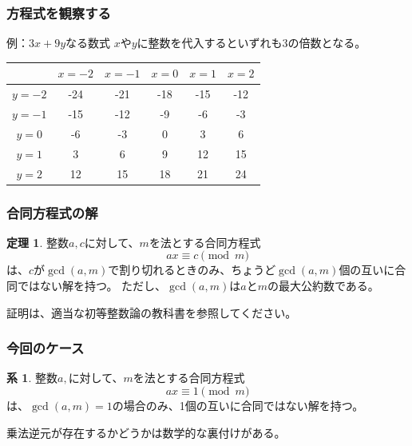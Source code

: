 \documentclass[aspectratio=169,dvipdfmx,14pt,notheorems]{beamer}
\theoremstyle{definition}
\newtheorem{theorem}{定理}
\newtheorem{corollary}{系}
\begin{document}
\begin{frame}[fragile]\frametitle{方程式を観察する}

\begin{exampleblock}{例：$3x + 9y$なる数式}
$x$や$y$に整数を代入するといずれも3の倍数となる。
\begin{table}[]
\begin{tabular}{|c|c|c|c|c|c|}
\hline
       & $x=-2$ & $x=-1$ & $x=0$ & $x=1$ & $x=2$ \\ \hline
$y=-2$ & -24    & -21    & -18   & -15   & -12   \\ \hline
$y=-1$ & -15    & -12    & -9    & -6    & -3    \\ \hline
$y=0$  & -6     & -3     & 0     & 3     & 6     \\ \hline
$y=1$  & 3      & 6      & 9     & 12    & 15    \\ \hline
$y=2$  & 12     & 15     & 18    & 21    & 24    \\ \hline
\end{tabular}
\end{table}

\end{exampleblock}

\end{frame}

\begin{frame}[fragile]\frametitle{合同方程式の解}

\begin{theorem}
整数$a, c$に対して、$m$を法とする合同方程式
\begin{equation*}
ax \equiv c \pmod{m}
\end{equation*}
は、$c$が$\gcd(a, m)$で割り切れるときのみ、ちょうど$\gcd(a, m)$個の互いに合同ではない解を持つ。
ただし、$\gcd(a, m)$は$a$と$m$の最大公約数である。
\end{theorem}
証明は、適当な初等整数論の教科書を参照してください。
\end{frame}

\begin{frame}[fragile]\frametitle{今回のケース}

\begin{corollary}
整数$a,$に対して、$m$を法とする合同方程式
\begin{equation*}
ax \equiv 1 \pmod{m}
\end{equation*}
は、$\gcd(a, m) = 1$の場合のみ、1個の互いに合同ではない解を持つ。
\end{corollary}
乗法逆元が存在するかどうかは数学的な裏付けがある。
\end{frame}
\end{document}
